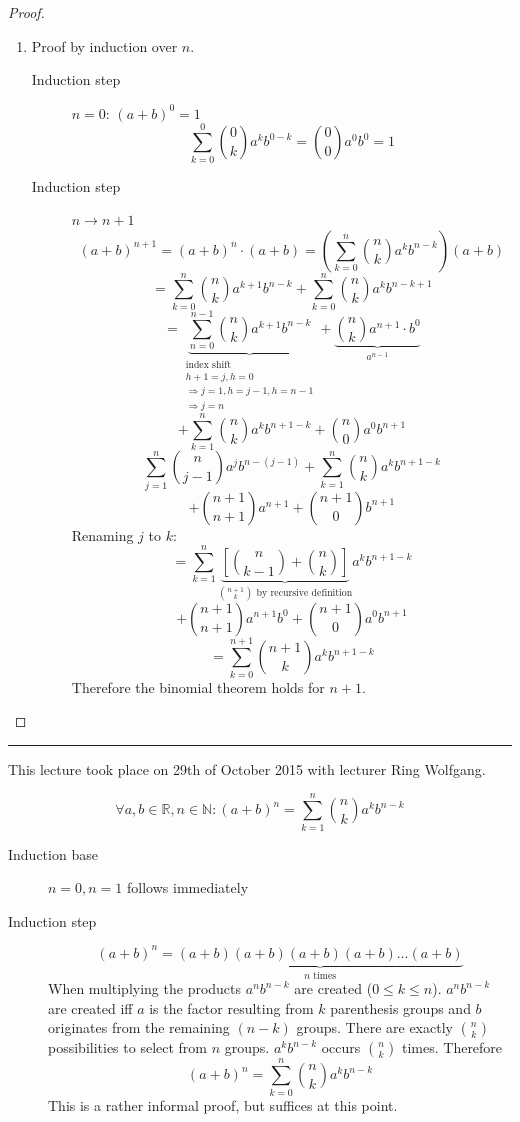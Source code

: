 \documentclass[a4paper,landscape,twocolumn]{article}
\newcommand\meta[3]{\hrule{} This #1 took place on #2 with lecturer #3.\par}
\begin{document}
\begin{proof}
  \begin{enumerate}
    \item
      Proof by induction over $n$.
      \begin{description}
        \item[Induction step] $n=0$: $(a + b)^0 = 1$
          \[ \sum_{k=0}^0 \binom{0}{k} a^k b^{0-k} = \binom{0}{0} a^0 b^0 = 1 \]
        \item[Induction step] $n \rightarrow n + 1$
          \[
            (a + b)^{n+1} = (a + b)^n \cdot (a + b)
            = \left(\sum_{k=0}^n \binom nk a^k b^{n-k}\right) (a + b)
          \] \[
            = \sum_{k=0}^n \binom nk a^{k+1} b^{n-k} + \sum_{k=0}^n \binom nk a^k b^{n-k+1}
          \] \[
            = \underbrace{\sum_{n=0}^{n-1} \binom nk a^{k+1} b^{n-k}}_{\substack{\text{index shift} \\ h + 1 = j, h =0 \\ \Rightarrow j=1, h = j-1, h=n-1 \\ \Rightarrow j = n}} +
              \underbrace{\binom nk a^{n+1} \cdot b^0}_{a^{n-1}}
          \] \[
            + \sum_{k=1}^n \binom nk a^k b^{n+1-k} +
              \binom n0 a^0 b^{n+1}
          \] \[
            \sum_{j=1}^n \binom{n}{j-1} a^j b^{n-(j-1)}
            + \sum_{k=1}^n \binom nk a^k b^{n+1-k}
          \] \[
            + \binom{n+1}{n+1} a^{n+1}
            + \binom{n+1}{0} b^{n+1}
          \]
          Renaming $j$ to $k$:
          \[
            = \sum_{k=1}^n \underbrace{\left[\binom{n}{k-1} + \binom nk\right]}_{\binom{n+1}{k} \text{ by recursive definition}} a^k b^{n+1-k}
          \] \[
            + \binom{n+1}{n+1} a^{n+1} b^0
            + \binom{n+1}{0} a^0 b^{n+1}
          \] \[
            = \sum_{k=0}^{n+1} \binom{n+1}{k} a^k b^{n+1-k}
          \]
          Therefore the binomial theorem holds for $n+1$.
      \end{description}
  \end{enumerate}
\end{proof}

\meta{lecture}{29th of October 2015}{Ring Wolfgang}

\[ \forall a, b \in \mathbb{R}, n \in \mathbb{N}: (a + b)^n = \sum_{k=1}^n \binom{n}{k} a^k b^{n-k}  \]
\begin{description}
  \item[Induction base] $n = 0, n = 1$ follows immediately
  \item[Induction step]
    \[ (a + b)^n = \underbrace{(a + b)(a + b)(a + b)(a + b)\dots(a + b)}_{n \text{ times}} \]
    When multiplying the products $a^n b^{n-k}$ are created ($0 \leq k \leq n$).
    $a^n b^{n-k}$ are created iff $a$ is the factor resulting from $k$ parenthesis groups and
    $b$ originates from the remaining $(n-k)$ groups.
    There are exactly $\binom{n}{k}$ possibilities to select from $n$ groups.
    $a^k b^{n-k}$ occurs $\binom nk$ times.
    Therefore
    \[ (a + b)^n = \sum_{k=0}^n \binom nk a^k b^{n-k} \]
    This is a rather informal proof, but suffices at this point.
\end{description}
\end{document}
